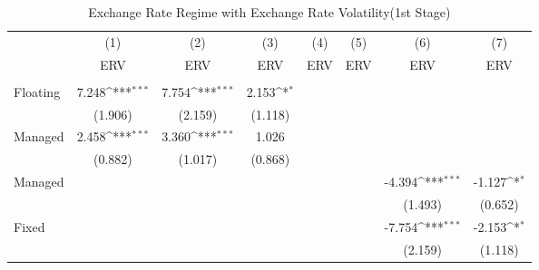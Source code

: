 \begin{table}[H] \def\sym#1{\ifmmode^{#1}\else\(^{#1}\)\fi} \caption{Exchange Rate Regime with Exchange Rate Volatility(1st Stage)} \begin{adjustbox}{max width=\textwidth} \begin{tabular}{l*{7}{c}} \\ \hline\hline
            &\multicolumn{1}{c}{(1)}&\multicolumn{1}{c}{(2)}&\multicolumn{1}{c}{(3)}&\multicolumn{1}{c}{(4)}&\multicolumn{1}{c}{(5)}&\multicolumn{1}{c}{(6)}&\multicolumn{1}{c}{(7)}\\
            &\multicolumn{1}{c}{ERV}&\multicolumn{1}{c}{ERV}&\multicolumn{1}{c}{ERV}&\multicolumn{1}{c}{ERV}&\multicolumn{1}{c}{ERV}&\multicolumn{1}{c}{ERV}&\multicolumn{1}{c}{ERV}\\
\hline \addlinespace \multicolumn{7}{l}{} \\  \addlinespace[2pt]
Floating    &       7.248\sym{***}&       7.754\sym{***}&       2.153\sym{*}  &                     &                     &                     &                     \\
            &     (1.906)         &     (2.159)         &     (1.118)         &                     &                     &                     &                     \\
\addlinespace
Managed     &       2.458\sym{***}&       3.360\sym{***}&       1.026         &                     &                     &                     &                     \\
            &     (0.882)         &     (1.017)         &     (0.868)         &                     &                     &                     &                     \\
\addlinespace
Managed     &                     &                     &                     &                     &                     &      -4.394\sym{***}&      -1.127\sym{*}  \\
            &                     &                     &                     &                     &                     &     (1.493)         &     (0.652)         \\
\addlinespace
Fixed       &                     &                     &                     &                     &                     &      -7.754\sym{***}&      -2.153\sym{*}  \\
            &                     &                     &                     &                     &                     &     (2.159)         &     (1.118)         \\

\end{tabular}
\end{adjustbox}
\end{table}
